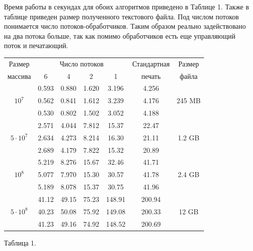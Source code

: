 Время работы в секундах для обоих алгоритмов приведено в Таблице 1.
Также в таблице приведен размер полученного текстового файла.
Под числом потоков понимается число потоков-обработчиков. 
Таким образом реально задействовано на два потока больше, так как помимо обработчиков есть еще управляющий поток и печатающий.
\begin{center}
\begin{longtable}{||c|c|c|c|c|c|c||}
\hline
\hline
Размер & \multicolumn{4}{c|}{Число потоков} & Стандартная & Размер\\
\hhline{~|-|-|-|-|~|~|}
массива & 6 & 4 & 2 & 1 & печать &файла\\
\hline
\hline
 & 0.593 & 0.880 & 1.620 & 3.196 & 4.256 & \\
\hhline{~|-|-|-|-|-|~|}
$10^7$   & 0.562 & 0.841 & 1.612 & 3.239 & 4.176 & 245 MB \\
\hhline{~|-|-|-|-|-|~|}
 & 0.530 & 0.802 & 1.502 & 3.052 & 4.188 &\\
\hline
&2.571& 4.044 & 7.812 & 15.37 & 22.47 & \\
\hhline{~|-|-|-|-|-|~|}
$5 \cdot 10^7$  & 2.634 & 4.273 & 8.214 & 16.30 & 21.11 &  1.2 GB\\
\hhline{~|-|-|-|-|-|~|}
 & 2.689 & 4.179 & 7.822 & 15.32 & 20.89 & \\
\hline
 & 5.219 & 8.276 & 15.67 & 32.46 & 41.71 & \\
\hhline{~|-|-|-|-|-|~|}
$10^8$  & 5.077 & 7.970 & 15.30 & 30.57 & 41.78 & 2.4 GB\\
\hhline{~|-|-|-|-|-|~|}
& 5.189 & 8.078 & 15.37 & 30.75 & 41.96 & \\
\hline
 & 41.12 & 49.15 & 75.23 & 148.91 & 200.94 & \\
\hhline{~|-|-|-|-|-|~|}
$5 \cdot 10^8$ & 40.23 & 50.08 & 75.92 & 149.08 & 200.33 & 12 GB\\
\hhline{~|-|-|-|-|-|~|}
 & 41.23 & 49.16 & 74.92 & 148.52 & 200.69 & \\
\hline
\hline
\end{longtable}
\small{Таблица 1.}
\end{center}

